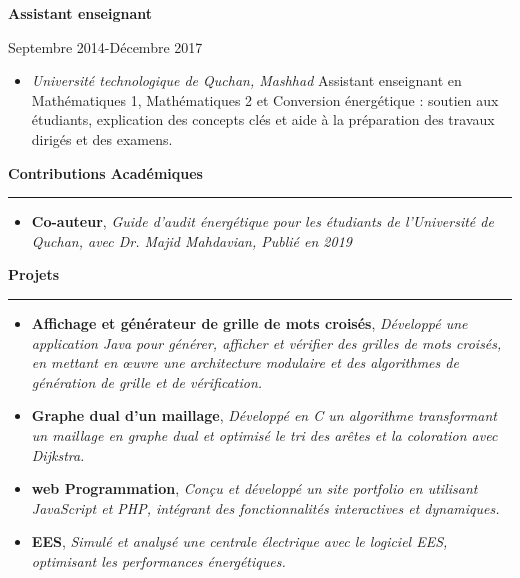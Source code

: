 \documentclass[a4paper]{letter}
\newcommand{\divider}{\rule{\linewidth}{0.9pt}}
\begin{document}
\begin{minipage}[t]{0.60\textwidth}
\vspace{3mm}

{ \textbf{Assistant enseignant}}

{ \footnotesize Septembre 2014-Décembre 2017}
\begin{itemize}
    \footnotesize \item \textit{Université technologique de Quchan, Mashhad}
    \newline
    Assistant enseignant en Mathématiques 1, Mathématiques 2 et Conversion énergétique : soutien aux étudiants, explication des concepts clés et aide à la préparation des travaux dirigés et des examens.
\end{itemize}





\vspace{3mm}


{\large \textbf{Contributions Académiques}}
\divider
\vspace{4mm}
\begin{itemize}
    \footnotesize \item {\textbf{Co-auteur}, \textit{Guide d’audit énergétique pour les étudiants de l’Université de Quchan, avec Dr. Majid Mahdavian, Publié en 2019}}


\end{itemize}

\vspace{3mm}



{\large \textbf{Projets}}
\divider
\vspace{4mm}
\begin{itemize}
    \footnotesize \item {\textbf{Affichage et générateur de grille de mots croisés}, \textit{Développé une application Java pour générer, afficher et vérifier des grilles de mots croisés, en mettant en œuvre une architecture modulaire et des algorithmes de génération de grille et de vérification.}}
    \vspace{2mm}
    \footnotesize \item {\textbf{Graphe dual d’un maillage}, \textit{Développé en C un algorithme transformant un maillage en graphe dual et optimisé le tri des arêtes et la coloration avec Dijkstra.}}
    \vspace{2mm}
    \footnotesize \item {\textbf{web Programmation}, \textit{Conçu et développé un site portfolio en utilisant JavaScript et PHP, intégrant des fonctionnalités interactives et dynamiques.}}
    \vspace{2mm}
    \footnotesize \item {\textbf{EES}, \textit{Simulé et analysé une centrale électrique avec le logiciel EES, optimisant les performances énergétiques.}}



\end{itemize}
\end{minipage}
\end{document}

